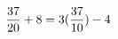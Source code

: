 \documentclass[preview]{standalone}
\begin{document}
\begin{align*}
\special{dvisvgm:raw <g id='unique000'>}\frac{37}{20} + 8 = 3(\frac{37}{10}) - 4\special{dvisvgm:raw </g>}
\end{align*}
\end{document}
